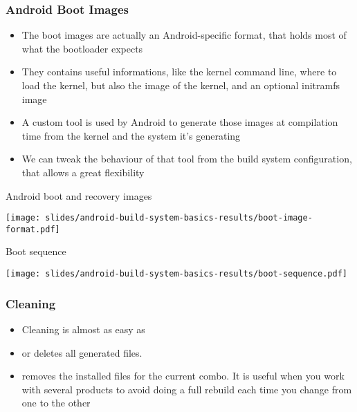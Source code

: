\begin{frame}
  \frametitle{Android Boot Images}
  \begin{itemize}
  \item The boot images are actually an Android-specific format, that
    holds most of what the bootloader expects
  \item They contains useful informations, like the kernel command
    line, where to load the kernel, but also the image of the kernel,
    and an optional initramfs image
  \item A custom  tool is used by Android to generate
    those images at compilation time from the kernel and the system
    it's generating
  \item We can tweak the behaviour of that tool from the build system
    configuration, that allows a great flexibility
  \end{itemize}
\end{frame}

\begin{frame}{Android boot and recovery images}
  \begin{center}
  \texttt{[image: slides/android-build-system-basics-results/boot-image-format.pdf]}
  \end{center}
\end{frame}

\begin{frame}{Boot sequence}
  \begin{center}
  \texttt{[image: slides/android-build-system-basics-results/boot-sequence.pdf]}
  \end{center}
\end{frame}

\begin{frame}
  \frametitle{Cleaning}
  \begin{itemize}
  \item Cleaning is almost as easy as 
  \item {} or  deletes all generated
    files.
  \item {} removes the installed files for the
    current combo. It is useful when you work with several products to
    avoid doing a full rebuild each time you change from one to the
    other
  \end{itemize}
\end{frame}
